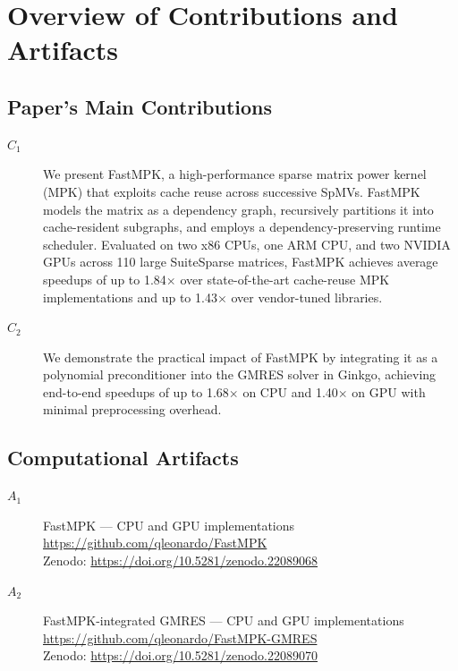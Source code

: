 \documentclass[conference]{IEEEtran}
\begin{document}


\appendixAD

\section{Overview of Contributions and Artifacts}

\subsection{Paper's Main Contributions}

\begin{description}
\item[$C_1$] We present FastMPK, a high-performance sparse matrix power kernel (MPK) that exploits cache reuse across successive SpMVs. FastMPK models the matrix as a dependency graph, recursively partitions it into cache-resident subgraphs, and employs a dependency-preserving runtime scheduler. Evaluated on two x86 CPUs, one ARM CPU, and two NVIDIA GPUs across 110 large SuiteSparse matrices, FastMPK achieves average speedups of up to 1.84$\times$ over state-of-the-art cache-reuse MPK implementations and up to 1.43$\times$ over vendor-tuned libraries.

\item[$C_2$] We demonstrate the practical impact of FastMPK by integrating it as a polynomial preconditioner into the GMRES solver in Ginkgo, achieving end-to-end speedups of up to 1.68$\times$ on CPU and 1.40$\times$ on GPU with minimal preprocessing overhead.
\end{description}

\subsection{Computational Artifacts}

\begin{description}
\item[$A_1$] FastMPK --- CPU and GPU implementations \\
\url{https://github.com/qleonardo/FastMPK} \\
Zenodo: \url{https://doi.org/10.5281/zenodo.22089068}

\item[$A_2$] FastMPK-integrated GMRES --- CPU and GPU implementations \\
\url{https://github.com/qleonardo/FastMPK-GMRES} \\
Zenodo: \url{https://doi.org/10.5281/zenodo.22089070}

\end{description}
\end{document}
